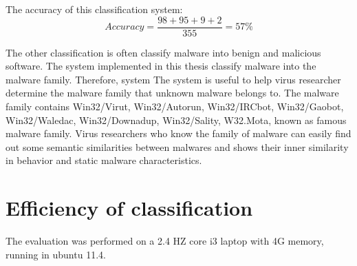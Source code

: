 The accuracy of this classification system:
\begin{equation}
Accuracy=\frac{98+95+9+2}{355}=57\%
\end{equation}

The other classification is often classify malware into benign and malicious software. The system implemented in this thesis classify malware into the malware family. Therefore, system The system is useful to help virus researcher determine the malware family that unknown malware belongs to. The malware family contains Win32/Virut, Win32/Autorun, Win32/IRCbot, Win32/Gaobot, Win32/Waledac, Win32/Downadup, Win32/Sality, W32.Mota, known as famous malware family. Virus researchers who know the family of malware can easily find out some semantic similarities between malwares and shows their inner similarity in behavior and static malware characteristics.

\section{Efficiency  of classification}
The evaluation was performed on a 2.4 HZ core i3 laptop with 4G memory, running in ubuntu 11.4. 	

